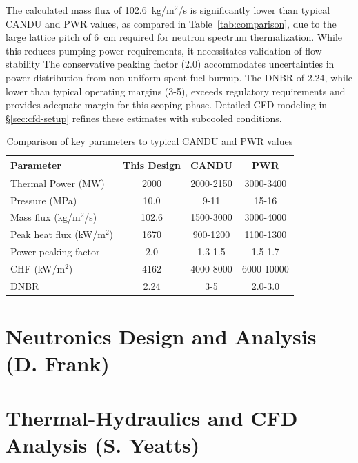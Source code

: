 \documentclass[12pt]{article}
\numberwithin{equation}{section}
\begin{document}
The calculated mass flux of 102.6~kg/m$^2$/s is significantly lower than typical CANDU and PWR values, as compared in Table~\ref{tab:comparison}, due to the large lattice pitch of 6~cm required for neutron spectrum thermalization. While this reduces pumping power requirements, it necessitates validation of flow stability The conservative peaking factor (2.0) accommodates uncertainties in power distribution from non-uniform spent fuel burnup. The DNBR of 2.24, while lower than typical operating margins (3-5), exceeds regulatory requirements and provides adequate margin for this scoping phase. Detailed CFD modeling in \S\ref{sec:cfd-setup} refines these estimates with subcooled conditions.

\begin{table}[H]
\centering
\caption{Comparison of key parameters to typical CANDU and PWR values}
\small
\begin{tabular}{lccc}
\toprule
\textbf{Parameter} & \textbf{This Design} & \textbf{CANDU} & \textbf{PWR} \\
\midrule
Thermal Power (MW) & 2000 & 2000-2150 & 3000-3400 \\
Pressure (MPa) & 10.0 & 9-11 & 15-16 \\
Mass flux (kg/m$^2$/s) & 102.6 & 1500-3000 & 3000-4000 \\
Peak heat flux (kW/m$^2$) & 1670 & 900-1200 & 1100-1300 \\
Power peaking factor & 2.0 & 1.3-1.5 & 1.5-1.7 \\
CHF (kW/m$^2$) & 4162 & 4000-8000 & 6000-10000 \\
DNBR & 2.24 & 3-5 & 2.0-3.0 \\
\bottomrule
\end{tabular}
\end{table}\label{tab:comparison}
\clearpage

\section{Neutronics Design and Analysis (D. Frank)}
\label{sec:neutronics}


\clearpage

\section{Thermal-Hydraulics and CFD Analysis (S. Yeatts)}
\label{sec:thermal-hydraulics}

\end{document}

